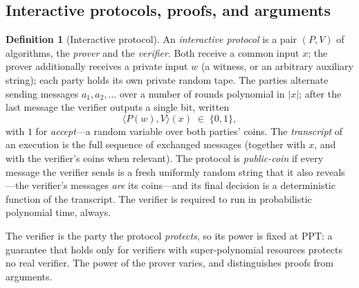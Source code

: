 \documentclass[11pt,a4paper]{article}
\theoremstyle{definition}
\newtheorem{definition}[theorem]{Definition}
\theoremstyle{remark}
\providecommand{\abs}[1]{\lvert #1 \rvert}
\begin{document}
\subsection{Interactive protocols, proofs, and arguments}
\label{zk:subsec:proofs}

\begin{definition}[Interactive protocol]\label{zk:def:protocol}
An \emph{interactive protocol} is a pair \((P, V)\) of algorithms,
the \emph{prover} and the \emph{verifier}. Both receive a common
input \(x\); the prover additionally receives a private input \(w\)
(a witness, or an arbitrary auxiliary string); each party holds its
own private random tape. The parties alternate sending messages
\(a_1, a_2, \dots\) over a number of rounds polynomial in
\(\abs{x}\); after the last message the verifier outputs a single
bit, written
\[
\langle P(w), V \rangle(x) \;\in\; \{0, 1\},
\]
with \(1\) for \emph{accept}---a random variable over both parties'
coins. The \emph{transcript} of an execution is the full sequence of
exchanged messages (together with \(x\), and with the verifier's
coins when relevant). The protocol is \emph{public-coin} if every
message the verifier sends is a fresh uniformly random string that it
also reveals---the verifier's messages \emph{are} its coins---and its
final decision is a deterministic function of the transcript. The
verifier is required to run in probabilistic polynomial time,
always.
\end{definition}

The verifier is the party the protocol \emph{protects}, so its power is
fixed at PPT: a guarantee that holds only for verifiers with
super-polynomial resources protects no real verifier. The power of the
prover varies, and distinguishes proofs from arguments.
\end{document}
